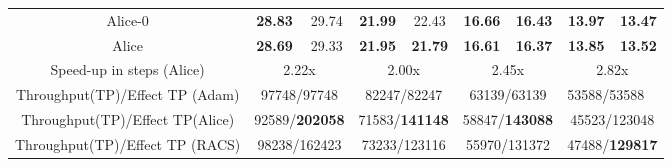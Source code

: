 \begin{table}[]
{\begin{tabular}{c|cccccccc}
Alice-0                         & \textbf{28.83}           & 29.74          & \textbf{21.99}            & 22.43         & \textbf{16.66}            & \textbf{16.43}         & \textbf{13.97}            & \textbf{13.47}         \\
Alice                           & \textbf{28.69}           & 29.33          & \textbf{21.95}            & \textbf{21.79}         & \textbf{16.61}            & \textbf{16.37}         & \textbf{13.85}            & \textbf{13.52}         \\ \hline
Speed-up in steps (Alice)       & \multicolumn{2}{c}{2.22x}        & \multicolumn{2}{c}{2.00x}        & \multicolumn{2}{c}{2.45x}        & \multicolumn{2}{c}{2.82x}        \\
Throughput(TP)/Effect TP (Adam) & \multicolumn{2}{c}{97748/97748}  & \multicolumn{2}{c}{82247/82247}  & \multicolumn{2}{c}{63139/63139}  & \multicolumn{2}{l}{53588/53588}  \\
Throughput(TP)/Effect TP(Alice) & \multicolumn{2}{c}{92589/\textbf{202058}} & \multicolumn{2}{c}{71583/\textbf{141148}} & \multicolumn{2}{l}{58847/\textbf{143088}} & \multicolumn{2}{c}{45523/123048} \\
Throughput(TP)/Effect TP (RACS) & \multicolumn{2}{c}{98238/162423} & \multicolumn{2}{c}{73233/123116} & \multicolumn{2}{c}{55970/131372} & \multicolumn{2}{c}{47488/\textbf{129817}} \\ \hline
\end{tabular}}
\end{table}


